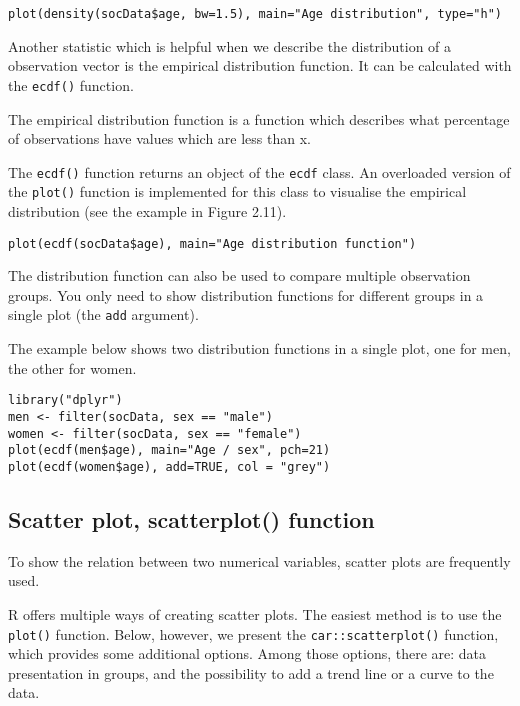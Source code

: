 \documentclass[]{book}
\theoremstyle{definition}
\theoremstyle{definition}
\theoremstyle{definition}
\theoremstyle{remark}
\begin{document}
\begin{verbatim}
plot(density(socData$age, bw=1.5), main="Age distribution", type="h")
\end{verbatim}

Another statistic which is helpful when we describe the distribution of
a observation vector is the empirical distribution function. It can be
calculated with the \texttt{ecdf()} function.

The empirical distribution function is a function which describes what
percentage of observations have values which are less than x.

The \texttt{ecdf()} function returns an object of the \texttt{ecdf}
class. An overloaded version of the \texttt{plot()} function is
implemented for this class to visualise the empirical distribution (see
the example in Figure 2.11).

\begin{verbatim}
plot(ecdf(socData$age), main="Age distribution function")
\end{verbatim}

The distribution function can also be used to compare multiple
observation groups. You only need to show distribution functions for
different groups in a single plot (the \texttt{add} argument).

The example below shows two distribution functions in a single plot, one
for men, the other for women.

\begin{verbatim}
library("dplyr")
men <- filter(socData, sex == "male")
women <- filter(socData, sex == "female")
plot(ecdf(men$age), main="Age / sex", pch=21)
plot(ecdf(women$age), add=TRUE, col = "grey")
\end{verbatim}

\subsection{Scatter plot, scatterplot() function}\label{part_245}

To show the relation between two numerical variables, scatter plots are
frequently used.

R offers multiple ways of creating scatter plots. The easiest method is
to use the \texttt{plot()} function. Below, however, we present the
\texttt{car::scatterplot()} function, which provides some additional
options. Among those options, there are: data presentation in groups,
and the possibility to add a trend line or a curve to the data.
\end{document}
